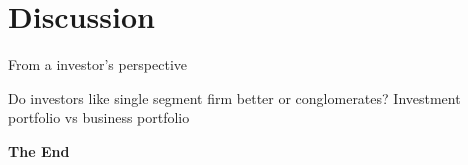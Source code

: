 \documentclass[aspectratio=169,xcolor=dvipsnames]{beamer}
\begin{document}
\section{Discussion}

\begin{frame}{From a investor's perspective}
    \begin{block}{Do investors like single segment firm better or conglomerates?}
        Investment portfolio vs business portfolio
    \end{block}
\end{frame}


\begin{frame}
    \Huge{\centerline{\textbf{The End}}}
\end{frame}
\end{document}
